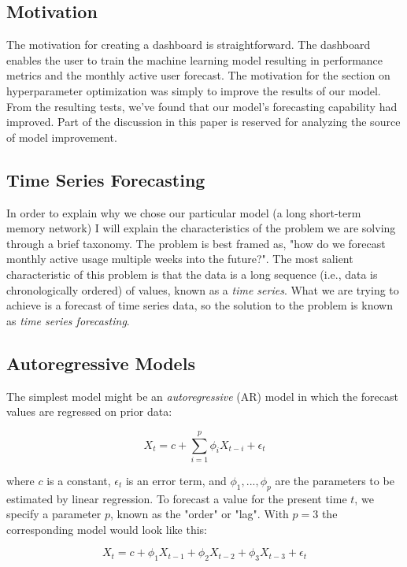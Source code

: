\documentclass[11pt, oneside]{article}
\begin{document}
\subsection{Motivation}
The motivation for creating a dashboard is straightforward. The dashboard enables the user to train the machine learning model resulting in performance metrics and the monthly active user forecast.
The motivation for the section on hyperparameter optimization was simply to improve the results of our model. From the resulting tests, we've found that our model's forecasting capability had improved. Part of the discussion in this paper is reserved for analyzing the source of model improvement.

\subsection{Time Series Forecasting}

In order to explain why we chose our particular model (a long short-term memory network) I will explain the characteristics of the problem we are solving through a brief taxonomy. The problem is best framed as, "how do we forecast monthly active usage multiple weeks into the future?". The most salient characteristic of this problem is that the data is a long sequence (i.e., data is chronologically ordered) of values, known as a \textit{time series}. What we are trying to achieve is a forecast of time series data, so the solution to the problem is known as \textit{time series forecasting}.

\subsection{Autoregressive Models}

The simplest model might be an \textit{autoregressive} (AR) model in which the forecast values are regressed on prior data:

\begin{equation}
  \label{eq:1}
  X_t = c + \sum_{i=1}^p \phi_i X_{t-i} + \epsilon_t
\end{equation}

where $c$ is a constant, $\epsilon_t$ is an error term, and $\phi_1, ..., \phi_p$ are the parameters to be estimated by linear regression. To forecast a value for the present time $t$, we specify a parameter $p$, known as the "order" or "lag". With $p=3$ the corresponding model would look like this:

\begin{equation}
  \label{eq:2}
  X_t = c + \phi_1 X_{t-1} + \phi_2 X_{t-2} + \phi_3 X_{t-3} + \epsilon_t
\end{equation}
\end{document}

